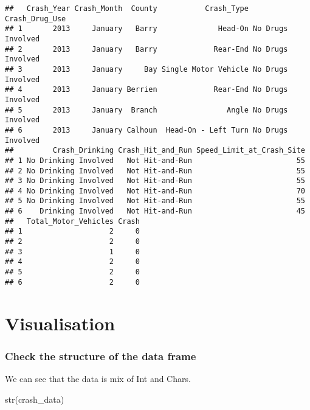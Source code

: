 \documentclass[
]{article}
\newenvironment{Shaded}{\begin{snugshade}}{\end{snugshade}}
\newcommand{\FunctionTok}[1]{\textcolor[rgb]{0.00,0.00,0.00}{#1}}
\newcommand{\NormalTok}[1]{#1}
\begin{document}
\begin{verbatim}
##   Crash_Year Crash_Month  County           Crash_Type    Crash_Drug_Use
## 1       2013     January   Barry              Head-On No Drugs Involved
## 2       2013     January   Barry             Rear-End No Drugs Involved
## 3       2013     January     Bay Single Motor Vehicle No Drugs Involved
## 4       2013     January Berrien             Rear-End No Drugs Involved
## 5       2013     January  Branch                Angle No Drugs Involved
## 6       2013     January Calhoun  Head-On - Left Turn No Drugs Involved
##         Crash_Drinking Crash_Hit_and_Run Speed_Limit_at_Crash_Site
## 1 No Drinking Involved   Not Hit-and-Run                        55
## 2 No Drinking Involved   Not Hit-and-Run                        55
## 3 No Drinking Involved   Not Hit-and-Run                        55
## 4 No Drinking Involved   Not Hit-and-Run                        70
## 5 No Drinking Involved   Not Hit-and-Run                        55
## 6    Drinking Involved   Not Hit-and-Run                        45
##   Total_Motor_Vehicles Crash
## 1                    2     0
## 2                    2     0
## 3                    1     0
## 4                    2     0
## 5                    2     0
## 6                    2     0
\end{verbatim}

\hypertarget{visualisation}{%
\section{Visualisation}\label{visualisation}}

\hypertarget{check-the-structure-of-the-data-frame}{%
\subsubsection{Check the structure of the data
frame}\label{check-the-structure-of-the-data-frame}}

We can see that the data is mix of Int and Chars.

\begin{Shaded}
\begin{Highlighting}[]
\FunctionTok{str}\NormalTok{(crash\_data)}
\end{Highlighting}
\end{Shaded}
\end{document}
